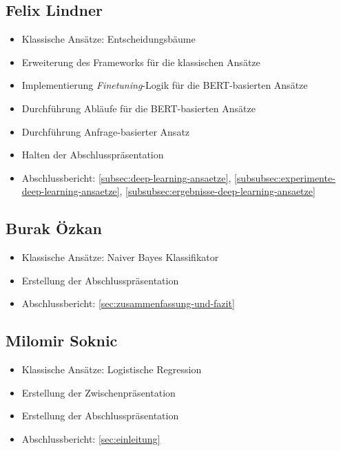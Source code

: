 \begin{multicols}{2}
\subsection{Felix Lindner}
\begin{itemize}
    \item Klassische Ansätze: Entscheidungsbäume
    \item Erweiterung des Frameworks für die klassischen Ansätze
    \item Implementierung \textit{Finetuning}-Logik für die BERT-basierten Ansätze
    \item Durchführung Abläufe für die BERT-basierten Ansätze
    \item Durchführung Anfrage-basierter Ansatz
    \item Halten der Abschlusspräsentation
    \item Abschlussbericht: \ref{subsec:deep-learning-ansaetze}, \ref{subsubsec:experimente-deep-learning-ansaetze}, \ref{subsubsec:ergebnisse-deep-learning-ansaetze}
\end{itemize}

\subsection{Burak Özkan}
\begin{itemize}
    \item Klassische Ansätze: Naiver Bayes Klassifikator
    \item Erstellung der Abschlusspräsentation
    \item Abschlussbericht: \ref{sec:zusammenfassung-und-fazit}
\end{itemize}

\subsection{Milomir Soknic}
\begin{itemize}
    \item Klassische Ansätze: Logistische Regression
    \item Erstellung der Zwischenpräsentation
    \item Erstellung der Abschlusspräsentation
    \item Abschlussbericht: \ref{sec:einleitung}
\end{itemize}

\end{multicols}

